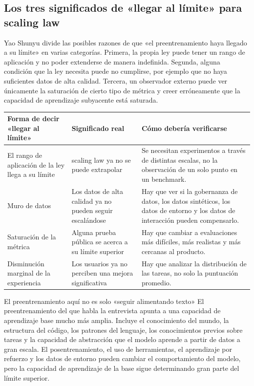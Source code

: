 \subsection{Los tres significados de «llegar al límite» para scaling law}

Yao Shunyu divide las posibles razones de que «el preentrenamiento haya llegado a su límite» en varias categorías. Primera, la propia ley puede tener un rango de aplicación y no poder extenderse de manera indefinida. Segunda, alguna condición que la ley necesita puede no cumplirse, por ejemplo que no haya suficientes datos de alta calidad. Tercera, un observador externo puede ver únicamente la saturación de cierto tipo de métrica y creer erróneamente que la capacidad de aprendizaje subyacente está saturada.

\noindent\begin{tabularx}{\textwidth}{p{}p{}X}
\toprule
Forma de decir «llegar al límite» & Significado real & Cómo debería verificarse \\
\midrule
El rango de aplicación de la ley llega a su límite & scaling law ya no se puede extrapolar & Se necesitan experimentos a través de distintas escalas, no la observación de un solo punto en un benchmark. \\
Muro de datos & Los datos de alta calidad ya no pueden seguir escalándose & Hay que ver si la gobernanza de datos, los datos sintéticos, los datos de entorno y los datos de interacción pueden compensarlo. \\
Saturación de la métrica & Alguna prueba pública se acerca a su límite superior & Hay que cambiar a evaluaciones más difíciles, más realistas y más cercanas al producto. \\
Disminución marginal de la experiencia & Los usuarios ya no perciben una mejora significativa & Hay que analizar la distribución de las tareas, no solo la puntuación promedio. \\
\bottomrule
\end{tabularx}

\begin{knowledgebox}{El preentrenamiento aquí no es solo «seguir alimentando texto»}
El preentrenamiento del que habla la entrevista apunta a una capacidad de aprendizaje base mucho más amplia. Incluye el conocimiento del mundo, la estructura del código, los patrones del lenguaje, los conocimientos previos sobre tareas y la capacidad de abstracción que el modelo aprende a partir de datos a gran escala. El posentrenamiento, el uso de herramientas, el aprendizaje por refuerzo y los datos de entorno pueden cambiar el comportamiento del modelo, pero la capacidad de aprendizaje de la base sigue determinando gran parte del límite superior.
\end{knowledgebox}

